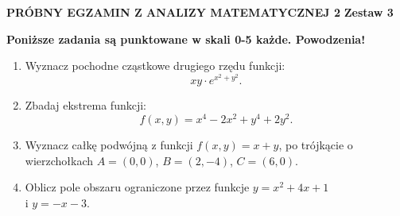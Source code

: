 \documentclass[12pt,a4paper]{article}
\begin{document}
	
	\begin{center}
		\LARGE
		\textbf{PRÓBNY EGZAMIN Z ANALIZY MATEMATYCZNEJ 2}
		\textbf{Zestaw 3}
	\end{center}
	\textbf{Poniższe zadania są punktowane w skali 0-5 każde. Powodzenia!}
	\begin{enumerate}
		\item Wyznacz pochodne cząstkowe drugiego rzędu funkcji:
		$$xy\cdot e^{x^2+y^2}.$$
		
		\item Zbadaj ekstrema funkcji:
		$$f(x,y)=x^4-2x^2+y^4+2y^2.$$
		
		\item Wyznacz całkę podwójną z funkcji $f(x,y)=x+y$, po trójkącie o wierzchołkach $A=(0,0)$,  $B=(2,-4)$, $C=(6,0).$ 
	
		
		\item Oblicz pole obszaru ograniczone przez funkcje $y=x^2+4x+1$ \\ i $y=-x-3$.
	\end{enumerate}
\end{document}
